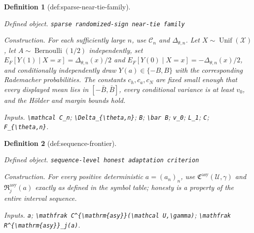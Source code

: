 \documentclass{article}
\newtheorem{definition}{Definition}
\begin{document}
\begin{definition}[def:sparse-near-tie-family]\label{def:sparse-near-tie-family}
\par\smallskip\noindent\emph{Defined object.} \texttt{sparse randomized-\allowbreak{}sign near-\allowbreak{}tie family}
\par\smallskip\noindent\emph{Construction.} For each sufficiently large \(n\), use \(\mathcal C_n\) and \(\Delta_{\theta,n}\). Let \(X\sim\operatorname{Unif}(\mathcal X)\), let \(A\sim\operatorname{Bernoulli}(1/2)\) independently, set \(E_F[Y(1)\mid X=x]=\Delta_{\theta,n}(x)/2\) and \(E_F[Y(0)\mid X=x]=-\Delta_{\theta,n}(x)/2\), and conditionally independently draw \(Y(a)\in\{-B,B\}\) with the corresponding Rademacher probabilities.  The constants \(c_h,c_a,c_N\) are fixed small enough that every displayed mean lies in \([-\bar B,\bar B]\), every conditional variance is at least \(v_0\), and the Hölder and margin bounds hold.
\par\smallskip\noindent\emph{Inputs.} \texttt{\textbackslash{}\allowbreak{}mathcal C\_\allowbreak{}n}; \texttt{\textbackslash{}\allowbreak{}Delta\_\allowbreak{}\{\textbackslash{}\allowbreak{}theta,\allowbreak{}n\}\allowbreak{}}; \texttt{B}; \texttt{\textbackslash{}\allowbreak{}bar B}; \texttt{v\_\allowbreak{}0}; \texttt{L\_\allowbreak{}1}; \texttt{C}; \texttt{F\_\allowbreak{}\{\textbackslash{}\allowbreak{}theta,\allowbreak{}n\}\allowbreak{}}.
\end{definition}

\begin{definition}[def:sequence-frontier]\label{def:sequence-frontier}
\par\smallskip\noindent\emph{Defined object.} \texttt{sequence-\allowbreak{}level honest adaptation criterion}
\par\smallskip\noindent\emph{Construction.} For every positive deterministic \(a=(a_n)_n\), use \(\mathfrak C^{\mathrm{asy}}(\mathcal U,\gamma)\) and \(\mathfrak R^{\mathrm{asy}}_j(a)\) exactly as defined in the symbol table; honesty is a property of the entire interval sequence.
\par\smallskip\noindent\emph{Inputs.} \texttt{a}; \texttt{\textbackslash{}\allowbreak{}mathfrak C\textasciicircum{}\{\textbackslash{}\allowbreak{}mathrm\{asy\}\allowbreak{}\}\allowbreak{}(\textbackslash{}\allowbreak{}mathcal U,\allowbreak{}\textbackslash{}\allowbreak{}gamma)}; \texttt{\textbackslash{}\allowbreak{}mathfrak R\textasciicircum{}\{\textbackslash{}\allowbreak{}mathrm\{asy\}\allowbreak{}\}\allowbreak{}\_\allowbreak{}j(a)}.
\end{definition}
\end{document}
